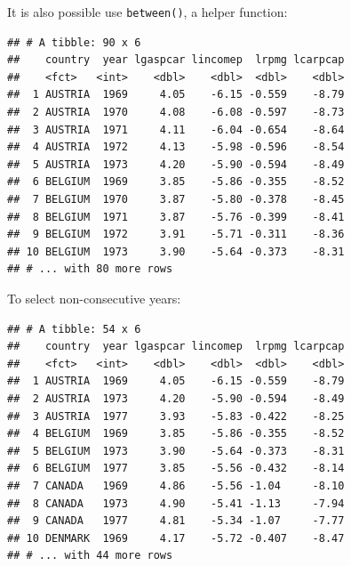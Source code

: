 \documentclass[]{gitbook}
\newenvironment{Shaded}{\begin{snugshade}}{\end{snugshade}}
\newcommand{\DecValTok}[1]{\textcolor[rgb]{0.00,0.00,0.81}{#1}}
\newcommand{\KeywordTok}[1]{\textcolor[rgb]{0.13,0.29,0.53}{\textbf{#1}}}
\newcommand{\NormalTok}[1]{#1}
\newcommand{\OperatorTok}[1]{\textcolor[rgb]{0.81,0.36,0.00}{\textbf{#1}}}
\newcommand{\StringTok}[1]{\textcolor[rgb]{0.31,0.60,0.02}{#1}}
\begin{document}
It is also possible use \texttt{between()}, a helper function:

\begin{Shaded}
\end{Shaded}

\begin{verbatim}
## # A tibble: 90 x 6
##    country  year lgaspcar lincomep  lrpmg lcarpcap
##    <fct>   <int>    <dbl>    <dbl>  <dbl>    <dbl>
##  1 AUSTRIA  1969     4.05    -6.15 -0.559    -8.79
##  2 AUSTRIA  1970     4.08    -6.08 -0.597    -8.73
##  3 AUSTRIA  1971     4.11    -6.04 -0.654    -8.64
##  4 AUSTRIA  1972     4.13    -5.98 -0.596    -8.54
##  5 AUSTRIA  1973     4.20    -5.90 -0.594    -8.49
##  6 BELGIUM  1969     3.85    -5.86 -0.355    -8.52
##  7 BELGIUM  1970     3.87    -5.80 -0.378    -8.45
##  8 BELGIUM  1971     3.87    -5.76 -0.399    -8.41
##  9 BELGIUM  1972     3.91    -5.71 -0.311    -8.36
## 10 BELGIUM  1973     3.90    -5.64 -0.373    -8.31
## # ... with 80 more rows
\end{verbatim}

To select non-consecutive years:

\begin{Shaded}
\end{Shaded}

\begin{verbatim}
## # A tibble: 54 x 6
##    country  year lgaspcar lincomep  lrpmg lcarpcap
##    <fct>   <int>    <dbl>    <dbl>  <dbl>    <dbl>
##  1 AUSTRIA  1969     4.05    -6.15 -0.559    -8.79
##  2 AUSTRIA  1973     4.20    -5.90 -0.594    -8.49
##  3 AUSTRIA  1977     3.93    -5.83 -0.422    -8.25
##  4 BELGIUM  1969     3.85    -5.86 -0.355    -8.52
##  5 BELGIUM  1973     3.90    -5.64 -0.373    -8.31
##  6 BELGIUM  1977     3.85    -5.56 -0.432    -8.14
##  7 CANADA   1969     4.86    -5.56 -1.04     -8.10
##  8 CANADA   1973     4.90    -5.41 -1.13     -7.94
##  9 CANADA   1977     4.81    -5.34 -1.07     -7.77
## 10 DENMARK  1969     4.17    -5.72 -0.407    -8.47
## # ... with 44 more rows
\end{verbatim}
\end{document}
